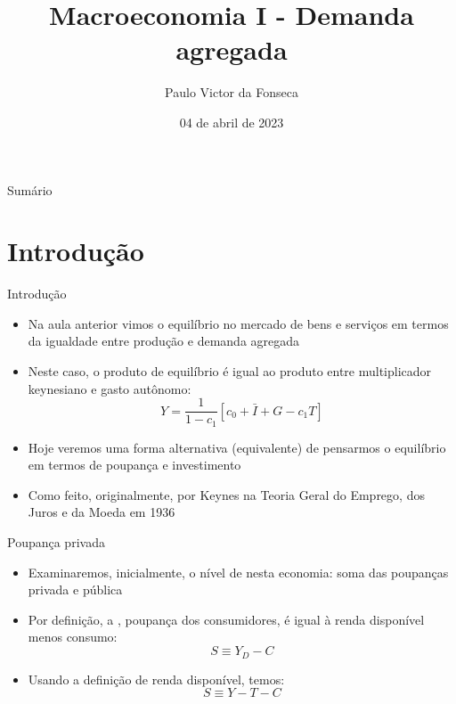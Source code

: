 \documentclass[10pt]{beamer}
\title[]{Macroeconomia I - Demanda agregada}
\author[]{Paulo Victor da Fonseca}
\date{04 de abril de 2023}
\begin{document}
\begin{frame}[plain]
\end{frame}

\begin{frame}{Sumário}
    \tableofcontents
\end{frame}

\section{Introdução}
\begin{frame}
    {Introdução}
    \begin{itemize}
        \item Na aula anterior vimos o equilíbrio no mercado de bens e serviços em termos da igualdade entre produção e demanda agregada\bigskip
        \item Neste caso, o produto de equilíbrio é igual ao produto entre multiplicador keynesiano e gasto autônomo:
              \[
                  Y = \frac{1}{1-c_1}[c_0 + \bar{I} + G - c_1T]
              \]
        \item Hoje veremos uma forma alternativa (equivalente) de pensarmos o equilíbrio em termos de poupança e investimento\bigskip
        \item Como feito, originalmente, por Keynes na Teoria Geral do Emprego, dos Juros e da Moeda em 1936
    \end{itemize}
\end{frame}

\begin{frame}
    {Poupança privada}
    \begin{itemize}
        \item Examinaremos, inicialmente, o nível de  nesta economia: soma das poupanças privada e pública\bigskip
        \item Por definição, a , poupança dos consumidores, é igual à renda disponível menos consumo:
              \begin{equation}
                  S \equiv Y_D - C
              \end{equation}
        \item Usando a definição de renda disponível, temos:
              \[
                  S \equiv Y - T - C
              \]
    \end{itemize}
\end{frame}
\end{document}
